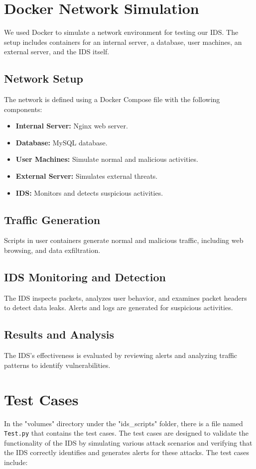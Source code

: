 \documentclass{article}
\begin{document}
\section{Docker Network Simulation}
We used Docker to simulate a network environment for testing our IDS. The setup includes containers for an internal server, a database, user machines, an external server, and the IDS itself.

\subsection{Network Setup}
The network is defined using a Docker Compose file with the following components:
\begin{itemize}
    \item \textbf{Internal Server:} Nginx web server.
    \item \textbf{Database:} MySQL database.
    \item \textbf{User Machines:} Simulate normal and malicious activities.
    \item \textbf{External Server:} Simulates external threats.
    \item \textbf{IDS:} Monitors and detects suspicious activities.
\end{itemize}

\subsection{Traffic Generation}
Scripts in user containers generate normal and malicious traffic, including web browsing, and data exfiltration.

\subsection{IDS Monitoring and Detection}
The IDS inspects packets, analyzes user behavior, and examines packet headers to detect data leaks. Alerts and logs are generated for suspicious activities.

\subsection{Results and Analysis}
The IDS's effectiveness is evaluated by reviewing alerts and analyzing traffic patterns to identify vulnerabilities.
\section{Test Cases}
In the "volumes" directory under the "ids\_scripts" folder, there is a file named \texttt{Test.py} that contains the test cases. The test cases are designed to validate the functionality of the IDS by simulating various attack scenarios and verifying that the IDS correctly identifies and generates alerts for these attacks. The test cases include:
\end{document}
